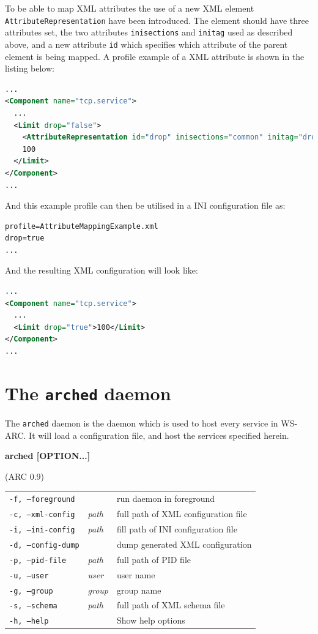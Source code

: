 \documentclass{article}
\begin{document}
To be able to map XML attributes the use of a new XML element
\texttt{AttributeRepresentation} have been introduced. The element should have
three attributes set, the two attributes \texttt{inisections} and
\texttt{initag} used as described above, and a new attribute \texttt{id} which
specifies which attribute of the parent element is being mapped. A profile
example of a XML attribute is shown in the listing below:
\begin{lstlisting}[language=xml,title=AttributeMapping.xml]
...
<Component name="tcp.service">
  ...
  <Limit drop="false">
    <AttributeRepresentation id="drop" inisections="common" initag="drop"/>
    100
  </Limit>
</Component>
...
\end{lstlisting}
And this example profile can then be utilised in a INI configuration file as:
\begin{lstlisting}[language=xml,title=AttributeMapping.ini]
profile=AttributeMappingExample.xml
drop=true
...
\end{lstlisting}
And the resulting XML configuration will look like:
\begin{lstlisting}[language=xml]
...
<Component name="tcp.service">
  ...
  <Limit drop="true">100</Limit>
</Component>
...
\end{lstlisting}

\section{The \texttt{arched} daemon}\label{sec:arched}
The \texttt{arched} daemon is the daemon which is used to host every service in
WS-ARC. It will load a configuration file, and host the services specified
herein.

\hspace*{0.5cm}
\begin{shaded}
\textbf{\sffamily arched [OPTION...]}
\end{shaded}
\vspace{-0.3cm}(ARC 0.9)\par
\begin{longtable}{llp{8cm}}
  \texttt{-f, --foreground} && run daemon in foreground\\
  \texttt{-c, --xml-config} & \textit{path} & full path of XML configuration file\\
  \texttt{-i, --ini-config} & \textit{path} & fill path of INI configuration file\\
  \texttt{-d, --config-dump} && dump generated XML configuration\\
  \texttt{-p, --pid-file} & \textit{path} & full path of PID file\\
  \texttt{-u, --user} & \textit{user} & user name\\
  \texttt{-g, --group} & \textit{group} & group name\\
  \texttt{-s, --schema} & \textit{path} & full path of XML schema file\\
  \texttt{-h, --help} && Show help options
\end{longtable}
\end{document}
